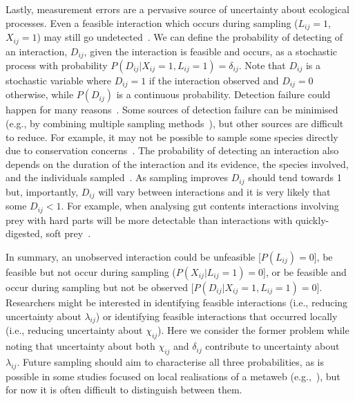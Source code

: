 \documentclass[12pt]{article}
\begin{document}
\begin{spacing}{2.0}
          Lastly, measurement errors are a pervasive source of uncertainty about ecological processes. Even a feasible interaction which occurs during sampling ($L_{ij}=1$, $X_{ij}=1$) may still go undetected~\citep{Jordano2016,Weinstein2017}. We can define the probability of detecting of an interaction, $D_{ij}$, given the interaction is feasible and occurs, as a stochastic process with  probability $P(D_{ij}|X_{ij}=1,L_{ij}=1)=\delta_{ij}$. Note that $D_{ij}$ is a stochastic variable where $D_{ij}=1$ if the interaction observed and $D_{ij}=0$ otherwise, while $P(D_{ij})$ is a continuous probability. Detection failure could happen for many reasons~\citep{Wirta2014}. Some sources of detection failure can be minimised (e.g., by combining multiple sampling methods~\citep{Wirta2014,Jordano2016}), but other sources are difficult to reduce. For example, it may not be possible to sample some species directly due to conservation concerns~\citep{Lagrue2015}. The probability of detecting an interaction also depends on the duration of the interaction and its evidence, the species involved, and the individuals sampled~\citep{Wells2013,Lagrue2015,Cirtwill2016,Weinstein2017}. As sampling improves $D_{ij}$ should tend towards 1 but, importantly, $D_{ij}$ will vary between interactions and it is very likely that some $D_{ij}<1$. For example, when analysing gut contents interactions involving prey with hard parts will be more detectable than interactions with quickly-digested, soft prey~\citep{Alberdi2018}.



    In summary, an unobserved interaction could be unfeasible [$P(L_{ij})=0$], be feasible but not occur during sampling ($P(X_{ij}|L_{ij}=1)=0$], or be feasible and occur during sampling but not be observed [$P(D_{ij}|X_{ij}=1,L_{ij}=1)=0$]. Researchers might be interested in identifying feasible interactions (i.e., reducing uncertainty about $\lambda_{ij}$) or identifying feasible interactions that occurred locally (i.e., reducing uncertainty about $\chi_{ij}$). Here we consider the former problem while noting that uncertainty about both $\chi_{ij}$ and $\delta_{ij}$ contribute to uncertainty about $\lambda_{ij}$. Future sampling should aim to characterise all three probabilities, as is possible in some studies focused on local realisations of a metaweb (e.g.,~\citet{Graham2018,Gravel2018}), but for now it is often difficult to distinguish between them.



\end{spacing}
\end{document}
